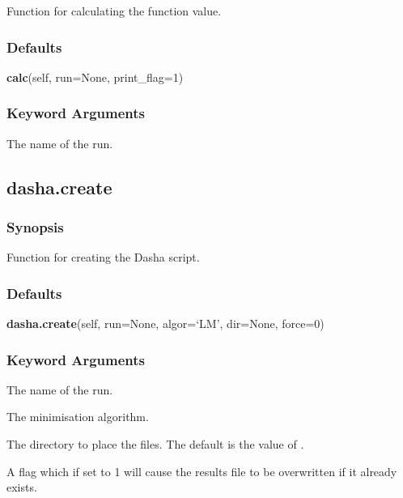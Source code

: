Function for calculating the function value.



\subsubsection{Defaults}

\textsf{\textbf{calc}(self, run=None, print\_flag=1)}


\subsubsection{Keyword Arguments}

  The name of the run. 





\newpage

\subsection{dasha.create}


\subsubsection{Synopsis}

Function for creating the Dasha script.



\subsubsection{Defaults}

\textsf{\textbf{dasha.create}(self, run=None, algor=`LM', dir=None, force=0)}


\subsubsection{Keyword Arguments}

  The name of the run. 

  The minimisation algorithm. 

  The directory to place the files.  The default is the value of . 

  A flag which if set to 1 will cause the results file to be overwritten if it already exists. 





